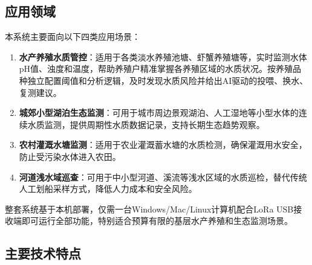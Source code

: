 \documentclass[12pt,a4paper]{ctexart}
\begin{document}
\subsection{应用领域}

本系统主要面向以下四类应用场景：

\begin{enumerate}[label=\arabic*.]
    \item \textbf{水产养殖水质管控}：适用于各类淡水养殖池塘、虾蟹养殖塘等，实时监测水体pH值、浊度和温度，帮助养殖户精准掌握各养殖区域的水质状况。按养殖品种独立配置阈值和分析逻辑，及时发现水质风险并给出AI驱动的投喂、换水、复测建议。

    \item \textbf{城郊小型湖泊生态监测}：可用于城市周边景观湖泊、人工湿地等小型水体的连续水质监测，提供周期性水质数据记录，支持长期生态趋势观察。

    \item \textbf{农村灌溉水塘监测}：适用于农业灌溉蓄水塘的水质检测，确保灌溉用水安全，防止受污染水体进入农田。

    \item \textbf{河道浅水域巡查}：可用于中小型河道、溪流等浅水区域的水质巡检，替代传统人工划船采样方式，降低人力成本和安全风险。
\end{enumerate}

整套系统基于本机部署，仅需一台Windows/Mac/Linux计算机配合LoRa USB接收端即可运行全部功能，特别适合预算有限的基层水产养殖和生态监测场景。

\subsection{主要技术特点}
\end{document}
